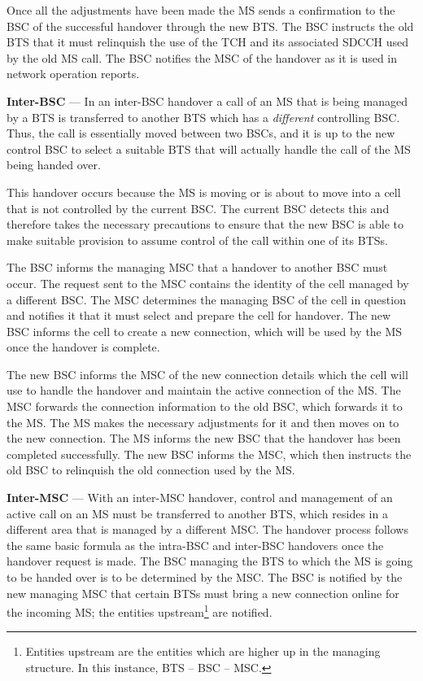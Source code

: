\begin{description}
Once all the adjustments have been made the MS sends a confirmation to the BSC of the successful handover through the new BTS. The BSC instructs the old BTS that it must relinquish the use of the TCH and its associated SDCCH used by the old MS call. The BSC notifies the MSC of the handover as it is used in network operation reports\cite{wirelesstelcoMullet,GSMArchitectureProtocolsServices}.
\item{\textbf{Inter-BSC}} --- In an inter-BSC handover a call of an MS that is being managed by a BTS is transferred to another BTS which has a \emph{different} controlling BSC. Thus, the call is essentially moved between two BSCs, and it is up to the new control BSC to select a suitable BTS that will actually handle the call of the MS being handed over\cite{wirelesstelcoMullet,GSMArchitectureProtocolsServices}.

This handover occurs because the MS is moving or is about to move into a cell that is not controlled by the current BSC. The current BSC detects this and therefore takes the necessary precautions to ensure that the new BSC is able to make suitable provision to assume control of the call within one of its BTSs\cite{wirelesstelcoMullet,GSMArchitectureProtocolsServices}.

The BSC informs the managing MSC that a handover to another BSC must occur. The request sent to the MSC contains the identity of the cell managed by a different BSC. The MSC determines the managing BSC of the cell in question and notifies it that it must select and prepare the cell for handover. The new BSC informs the cell to create a new connection, which will be used by the MS once the handover is complete\cite{wirelesstelcoMullet,GSMArchitectureProtocolsServices}.

The new BSC informs the MSC of the new connection details which the cell will use to handle the handover and maintain the active connection of the MS. The MSC forwards the connection information to the old BSC, which forwards it to the MS. The MS makes the necessary adjustments for it and then moves on to the new connection. The MS informs the new BSC that the handover has been completed successfully. The new BSC informs the MSC, which then instructs the old BSC to relinquish the old connection used by the MS\cite{wirelesstelcoMullet,GSMArchitectureProtocolsServices}.
\item{\textbf{Inter-MSC}} --- With an inter-MSC handover, control and management of an active call on an MS must be transferred to another BTS, which resides in a different area that is managed by a different MSC. The handover process follows the same basic formula as the intra-BSC and inter-BSC handovers once the handover request is made\cite{wirelesstelcoMullet,GSMArchitectureProtocolsServices}.
The BSC managing the BTS to which the MS is going to be handed over is to be determined by the MSC. The BSC is notified by the new managing MSC that certain BTSs must bring a new connection online for the incoming MS; the entities upstream\footnote{Entities upstream are the entities which are higher up in the managing structure. In this instance, BTS -- BSC -- MSC.} are notified\cite{wirelesstelcoMullet,GSMArchitectureProtocolsServices}.


\end{description}
